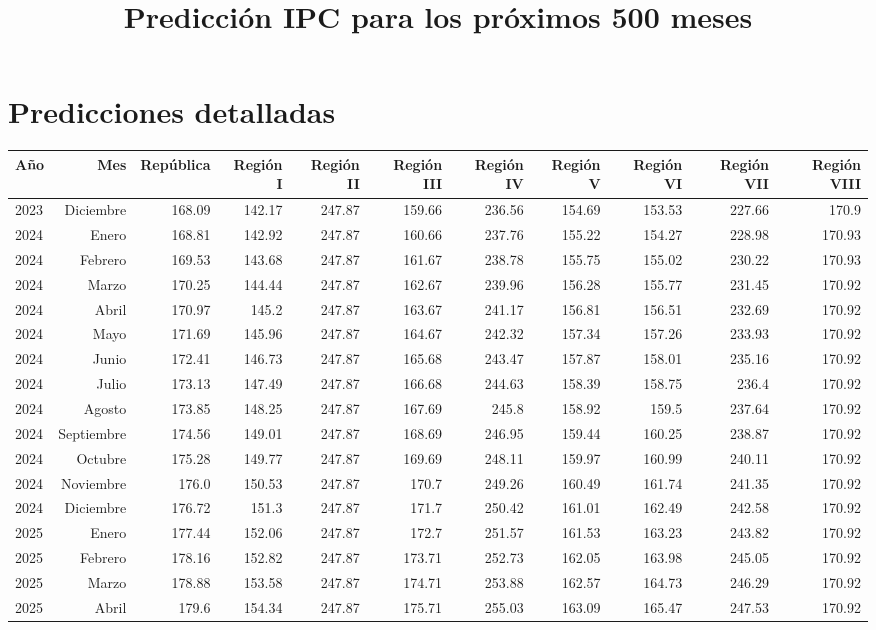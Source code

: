 \documentclass{article}%
\title{Predicción IPC para los próximos 500 meses}%
\date{}%
\begin{document}
%
\normalsize%
\maketitle%
\section*{Predicciones detalladas}%
\label{sec:Prediccionesdetalladas}%
\begin{longtable}{|l r|r|r|r|r|r|r|r|r|r|}%
\hline%
Año&Mes&República&Región I&Región II&Región III&Región IV&Región V&Región VI&Región VII&Región VIII\\%
\hline%
2023&Diciembre&168.09&142.17&247.87&159.66&236.56&154.69&153.53&227.66&170.9\\%
2024&Enero&168.81&142.92&247.87&160.66&237.76&155.22&154.27&228.98&170.93\\%
2024&Febrero&169.53&143.68&247.87&161.67&238.78&155.75&155.02&230.22&170.93\\%
2024&Marzo&170.25&144.44&247.87&162.67&239.96&156.28&155.77&231.45&170.92\\%
2024&Abril&170.97&145.2&247.87&163.67&241.17&156.81&156.51&232.69&170.92\\%
2024&Mayo&171.69&145.96&247.87&164.67&242.32&157.34&157.26&233.93&170.92\\%
2024&Junio&172.41&146.73&247.87&165.68&243.47&157.87&158.01&235.16&170.92\\%
2024&Julio&173.13&147.49&247.87&166.68&244.63&158.39&158.75&236.4&170.92\\%
2024&Agosto&173.85&148.25&247.87&167.69&245.8&158.92&159.5&237.64&170.92\\%
2024&Septiembre&174.56&149.01&247.87&168.69&246.95&159.44&160.25&238.87&170.92\\%
2024&Octubre&175.28&149.77&247.87&169.69&248.11&159.97&160.99&240.11&170.92\\%
2024&Noviembre&176.0&150.53&247.87&170.7&249.26&160.49&161.74&241.35&170.92\\%
2024&Diciembre&176.72&151.3&247.87&171.7&250.42&161.01&162.49&242.58&170.92\\%
2025&Enero&177.44&152.06&247.87&172.7&251.57&161.53&163.23&243.82&170.92\\%
2025&Febrero&178.16&152.82&247.87&173.71&252.73&162.05&163.98&245.05&170.92\\%
2025&Marzo&178.88&153.58&247.87&174.71&253.88&162.57&164.73&246.29&170.92\\%
2025&Abril&179.6&154.34&247.87&175.71&255.03&163.09&165.47&247.53&170.92\\%

\end{longtable}
\end{document}
